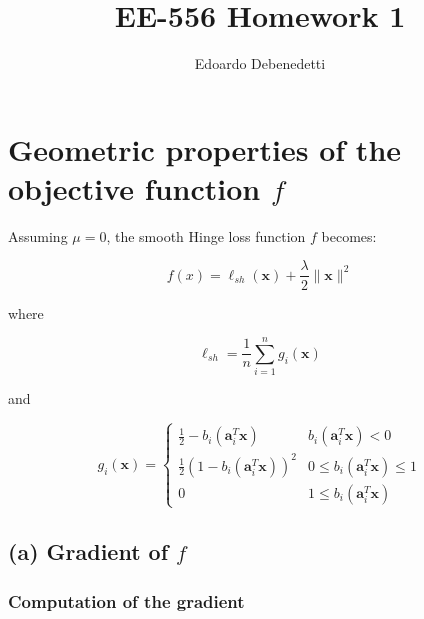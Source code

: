 \documentclass[12pt]{article}
\title{EE-556 Homework 1}
\author{Edoardo Debenedetti}
\newcommand{\xb}{\mathbf{x}}
\newcommand{\ab}{\mathbf{a}}
\newcommand{\abi}{\ab_i}
\newcommand{\xnorm}{\lVert \mathbf{\xb} \rVert}
\newcommand{\sumin}{\sum_{i = 1}^n}
\newcommand{\ellsh}{\ell_{sh}}
\newcommand{\ax}{\abi^T\xb}
\newcommand{\fracn}{\frac{1}{n}}
\newcommand{\linearpred}{b_i(\ax) < 0}
\newcommand{\quadrpred}{0 \leq b_i(\ax) \leq 1}
\begin{document}
\maketitle

\section{Geometric properties of the objective function $f$}

Assuming $\mu = 0$, the smooth Hinge loss function $f$ becomes:

\begin{equation} \label{def:hinge_loss}
    f(x) = \ellsh(\xb) + \frac{\lambda}{2} \xnorm ^ 2
\end{equation}

where

\begin{equation} \label{def:l}
    \ellsh = \fracn \sumin g_i(\xb)
\end{equation}

and

\begin{equation}
    g_i(\xb) = \begin{cases} \label{def:g}
    \frac{1}{2} - b_i(\ax)         & \linearpred \\
    \frac{1}{2}(1 - b_i(\ax))^2    & \quadrpred \\
    0                                   & 1 \le b_i(\ax)
\end{cases}
\end{equation}

\subsection*{(a) Gradient of $f$}

\subsubsection*{Computation of the gradient}
\end{document}

